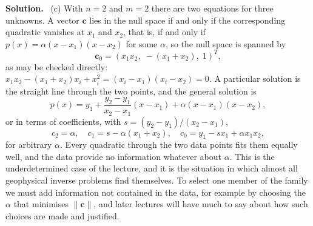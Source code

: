 \documentclass[a4paper,12pt]{paper}
\newcounter{example}
\newenvironment{solution}{\par\noindent\textbf{Solution.}\ }{\par\medskip}
\begin{document}
\begin{solution}
(c) With $n=2$ and $m=2$ there are two equations for three unknowns. A vector $\mathbf{c}$
lies in the null space if and only if the corresponding quadratic vanishes at $x_{1}$ and
$x_{2}$, that is, if and only if $p(x)=\alpha(x-x_{1})(x-x_{2})$ for some $\alpha$, so the
null space is spanned by
\begin{equation}
\mathbf{c}_{0}=\left(x_{1}x_{2},\;-(x_{1}+x_{2}),\;1\right)^{T},
\label{eq:40}
\end{equation}
as may be checked directly: $x_{1}x_{2}-(x_{1}+x_{2})x_{i}+x_{i}^{2}=(x_{i}-x_{1})(x_{i}-x_{2})=0$.
A particular solution is the straight line through the two points, and the general
solution is
\begin{equation}
p(x)=y_{1}+\frac{y_{2}-y_{1}}{x_{2}-x_{1}}(x-x_{1})+\alpha(x-x_{1})(x-x_{2}),
\label{eq:41}
\end{equation}
or in terms of coefficients, with $s=(y_{2}-y_{1})/(x_{2}-x_{1})$,
\begin{equation}
c_{2}=\alpha,\quad c_{1}=s-\alpha(x_{1}+x_{2}),\quad c_{0}=y_{1}-sx_{1}+\alpha x_{1}x_{2},
\label{eq:42}
\end{equation}
for arbitrary $\alpha$. Every quadratic through the two data points fits them equally
well, and the data provide no information whatever about $\alpha$. This is the
underdetermined case of the lecture, and it is the situation in which almost all
geophysical inverse problems find themselves. To select one member of the family we must
add information not contained in the data, for example by choosing the $\alpha$ that
minimises $\|\mathbf{c}\|$, and later lectures will have much to say about how such
choices are made and justified.


\end{solution}
\end{document}
